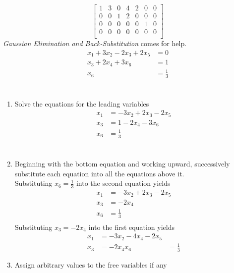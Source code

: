 \documentclass[a4paper, 12pt]{article}
\begin{document}
\[ \left[
\begin{array}{ccccccc} 
1  &  3  &  0 &  4  &  2 &  0 & 0\\
0  &  0  &  1 &  2  &  0 &  0 & 0\\
0  &  0  &  0 &  0  &  0 &  1 & 0\\ 
0  &  0  &  0 &   0 &  0 &  0 & 0\\
\end{array} 
\right] \] 
\textit{Gaussian Elimination and Back-Substitution} comes for help.
\begin{align*}
    x_1 + 3x_2 - 2x_3 + 2x_5 &= 0 \\
    x_3 + 2x_4 + 3x_6 &= 1 \\
    x_6 &= \frac{1}{3} \\
\end{align*}
\\
\begin{enumerate}
\item Solve the equations for the leading variables
\begin{align*}
    x_1 &= -3x_2 + 2x_3 - 2x_5 \\
    x_3 &= 1 - 2x_4 - 3x_6 \\
    x_6 &= \frac{1}{3} \\
\end{align*}
\\
\item Beginning with the bottom equation and working upward, 
successively substitute each equation into all the equations
above it. \\
Substituting $x_6 = \frac{1}{3}$ into the second equation yields
\begin{align*}
    x_1 &= -3x_2 + 2x_3 - 2x_5 \\
    x_3 &= - 2x_4\\
    x_6 &= \frac{1}{3} \\
\end{align*}
Substituting $x_3 = -2x_4$ into the first equation yields
\begin{align*}
    x_1 &= -3x_2 - 4x_4 - 2x_5\\
    x_3 &= -2x_4
    x_6 &= \frac{1}{3}
\end{align*}
\item Assign arbitrary values to the free variables if any

\end{enumerate}
\end{document}
